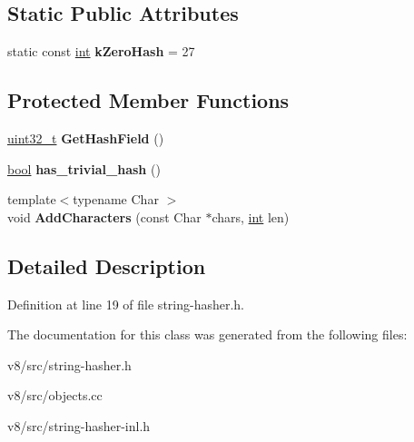 \subsection*{Static Public Attributes}
\begin{DoxyCompactItemize}
\item 
\mbox{\label{classv8_1_1internal_1_1StringHasher_ae0e5f2b5dc2ba3f181591f7b63f9149b}} 
static const \mbox{\hyperlink{classint}{int}} {\bfseries k\+Zero\+Hash} = 27
\end{DoxyCompactItemize}
\subsection*{Protected Member Functions}
\begin{DoxyCompactItemize}
\item 
\mbox{\label{classv8_1_1internal_1_1StringHasher_a24cb87423be59db3fe160354f68d7a96}} 
\mbox{\hyperlink{classuint32__t}{uint32\+\_\+t}} {\bfseries Get\+Hash\+Field} ()
\item 
\mbox{\label{classv8_1_1internal_1_1StringHasher_ae1dc7e4c63246108c06add8f976a3972}} 
\mbox{\hyperlink{classbool}{bool}} {\bfseries has\+\_\+trivial\+\_\+hash} ()
\item 
\mbox{\label{classv8_1_1internal_1_1StringHasher_a77e937ce030d8be14c67cbf03f5b6980}} 
{\footnotesize template$<$typename Char $>$ }\\void {\bfseries Add\+Characters} (const Char $\ast$chars, \mbox{\hyperlink{classint}{int}} len)
\end{DoxyCompactItemize}


\subsection{Detailed Description}


Definition at line 19 of file string-\/hasher.\+h.



The documentation for this class was generated from the following files\+:\begin{DoxyCompactItemize}
\item 
v8/src/string-\/hasher.\+h\item 
v8/src/objects.\+cc\item 
v8/src/string-\/hasher-\/inl.\+h\end{DoxyCompactItemize}
